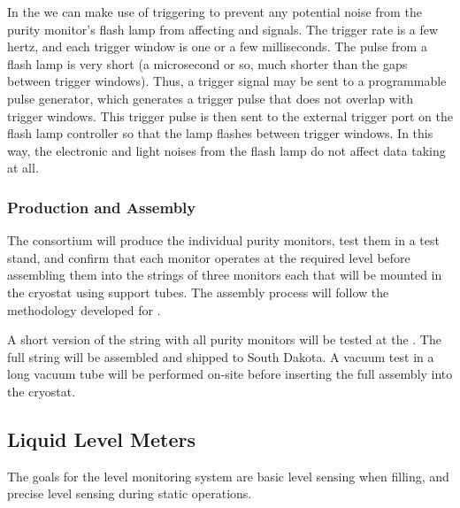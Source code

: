 In the  we can make use of triggering to prevent any potential noise from the purity monitor's flash lamp from affecting  and  signals. The  trigger rate is a few hertz, and each trigger window is one or a few milliseconds. %
The pulse from a flash lamp is very short (a microsecond or so, much shorter than the gaps between  trigger windows). 
Thus, a  trigger signal may be sent to a programmable pulse generator, %
which generates a trigger pulse that does not overlap with  trigger windows. This trigger pulse %
is then sent to the external trigger port on the flash lamp  controller so that the lamp flashes between  trigger windows. In this way, the electronic and light noises from the flash lamp do %
not affect %
data taking at all.



\subsubsection{Production and Assembly}
\label{sec:PrMon-Production-Assembly}

The  consortium will produce the individual purity monitors, test them in a test stand, and confirm that each monitor operates at the required level before assembling them into the strings of three monitors each that will be mounted in the  cryostat using support tubes. The assembly process will follow the methodology developed for .



A short version of the %
string with all purity monitors will be tested at the .
The full string will be assembled and shipped to South Dakota. %
 A vacuum test in a long vacuum tube will be performed on-site before inserting the full assembly into the  cryostat. 



\subsection{Liquid Level Meters}

The goals for the  level monitoring system are basic level sensing when filling, and precise level sensing during static operations. 

